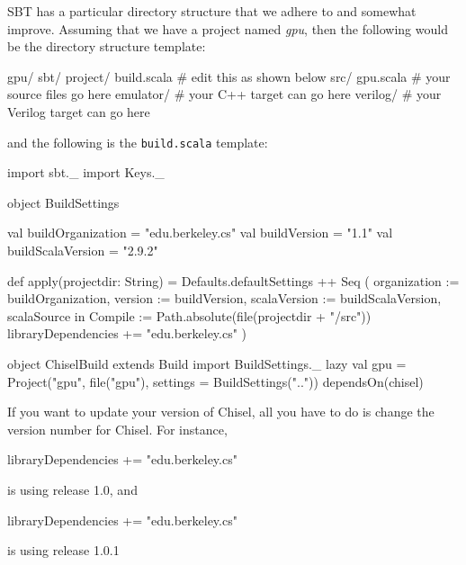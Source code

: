 \documentclass[twocolumn, 10pt]{article}
\begin{document}
SBT has a particular directory structure that we adhere to and
somewhat improve.  Assuming that we have a project named {\em gpu},
then the following would be the directory structure template:

\begin{bash}
gpu/
  sbt/
    project/
      build.scala # edit this as shown below
  src/ 
    gpu.scala     # your source files go here
  emulator/       # your C++ target can go here
  verilog/        # your Verilog target can go here
\end{bash}

\noindent
and the following is the \verb+build.scala+ template:

\begin{scala}
import sbt._
import Keys._

object BuildSettings {
  val buildOrganization = "edu.berkeley.cs"
  val buildVersion = "1.1"
  val buildScalaVersion = "2.9.2"

  def apply(projectdir: String) = {
    Defaults.defaultSettings ++ Seq (
      organization := buildOrganization,
      version      := buildVersion,
      scalaVersion := buildScalaVersion,
      scalaSource in Compile := 
        Path.absolute(file(projectdir + "/src"))
      libraryDependencies += 
        "edu.berkeley.cs" %
    )
  }
}

object ChiselBuild extends Build {
  import BuildSettings._
  lazy val gpu =
    Project("gpu", file("gpu"), 
            settings = BuildSettings("..")) 
      dependsOn(chisel)
}
\end{scala}

If you want to update your version of Chisel, all you have to do is
change the version number for Chisel.  For instance,

\begin{scala}
libraryDependencies += "edu.berkeley.cs" %
\end{scala}

\noindent
is using release 1.0, and

\begin{scala}
libraryDependencies += "edu.berkeley.cs" %
\end{scala}

\noindent
is using release 1.0.1
\end{document}
